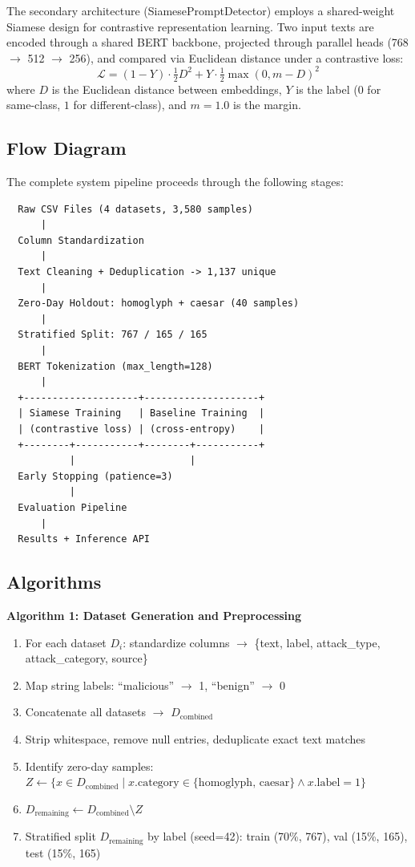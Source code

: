 \documentclass[11pt]{article}
\begin{document}
The secondary architecture (SiamesePromptDetector) employs a shared-weight Siamese design for contrastive representation learning. Two input texts are encoded through a shared BERT backbone, projected through parallel heads (768 $\to$ 512 $\to$ 256), and compared via Euclidean distance under a contrastive loss:
\begin{equation}
\mathcal{L} = (1-Y) \cdot \tfrac{1}{2} D^2 + Y \cdot \tfrac{1}{2} \max(0, m - D)^2
\end{equation}
where $D$ is the Euclidean distance between embeddings, $Y$ is the label ($0$ for same-class, $1$ for different-class), and $m = 1.0$ is the margin.

\subsection{Flow Diagram}

The complete system pipeline proceeds through the following stages:

\begin{verbatim}
  Raw CSV Files (4 datasets, 3,580 samples)
      |
  Column Standardization
      |
  Text Cleaning + Deduplication -> 1,137 unique
      |
  Zero-Day Holdout: homoglyph + caesar (40 samples)
      |
  Stratified Split: 767 / 165 / 165
      |
  BERT Tokenization (max_length=128)
      |
  +--------------------+--------------------+
  | Siamese Training   | Baseline Training  |
  | (contrastive loss) | (cross-entropy)    |
  +--------+-----------+--------+-----------+
           |                    |
  Early Stopping (patience=3)
           |
  Evaluation Pipeline
      |
  Results + Inference API
\end{verbatim}

\subsection{Algorithms}

\textbf{Algorithm 1: Dataset Generation and Preprocessing}
\begin{enumerate}[leftmargin=*]
  \item For each dataset $D_i$: standardize columns $\to$ \{text, label, attack\_type, attack\_category, source\}
  \item Map string labels: ``malicious'' $\to$ 1, ``benign'' $\to$ 0
  \item Concatenate all datasets $\to$ $D_{\text{combined}}$
  \item Strip whitespace, remove null entries, deduplicate exact text matches
  \item Identify zero-day samples: $Z \gets \{x \in D_{\text{combined}} \mid x.\text{category} \in \{\text{homoglyph, caesar}\} \wedge x.\text{label} = 1\}$
  \item $D_{\text{remaining}} \gets D_{\text{combined}} \setminus Z$
  \item Stratified split $D_{\text{remaining}}$ by label (seed=42): train (70\%, 767), val (15\%, 165), test (15\%, 165)
\end{enumerate}
\end{document}
